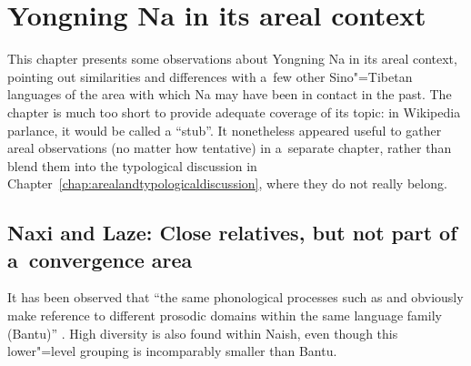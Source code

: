 \chapter{Yongning Na in its areal context}
\label{chap:arealperspectives}
\label{sec:acomparisonwithothersinotibetanlanguages}

This chapter presents some observations about Yongning Na in its areal
context, pointing out similarities and differences with a~few other Sino"=Tibetan languages of the area with which Na may have been in contact in the past. The chapter is much too short to provide adequate coverage of its topic: in Wikipedia parlance, it would be called a “stub”. It nonetheless appeared useful to gather areal observations (no matter how tentative) in a~separate chapter, rather than blend them into the typological discussion in Chapter~\ref{chap:arealandtypologicaldiscussion}, where they do not really belong.


\section{Naxi and Laze: Close relatives, but not part of a~convergence area}
\label{sec:compwithnaxi}
\label{sec:comparisonwithinnaish}

It has been observed that “the same phonological processes such as  and 
obviously make reference to different prosodic domains within the same language family ({Bantu})”
\citep[132]{zerbian2006a}. High diversity is also found within Naish, even though this lower"=level grouping is incomparably {\linebreak}smaller than Bantu.

